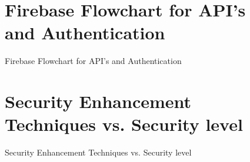 \begin{figure}[h]
\section{Firebase Flowchart for API’s and Authentication } 
  \centering
  \caption{Firebase Flowchart for API’s and Authentication}
  
\end{figure}
\begin{figure}[h]
\section{Security Enhancement Techniques vs. Security level} 
  \centering
  \caption{Security Enhancement Techniques vs. Security level}
  
\end{figure}